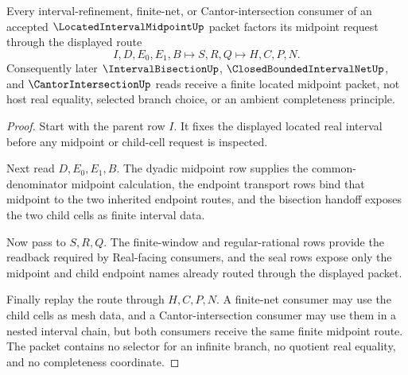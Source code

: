 \begin{theorem}
\label{thm:located-interval-midpoint-handoff}
Every interval-refinement, finite-net, or Cantor-intersection consumer of an accepted $\LocatedIntervalMidpointUp$ packet factors its midpoint request through the displayed route
$$
I,D,E_0,E_1,B \longmapsto S,R,Q \longmapsto H,C,P,N .
$$
Consequently later $\IntervalBisectionUp$, $\ClosedBoundedIntervalNetUp$, and $\CantorIntersectionUp$ reads receive a finite located midpoint packet, not host real equality, selected branch choice, or an ambient completeness principle.
\end{theorem}
\begin{proof}
Start with the parent row $I$. It fixes the displayed located real interval before any midpoint or child-cell request is inspected.

Next read $D,E_0,E_1,B$. The dyadic midpoint row supplies the common-denominator midpoint calculation, the endpoint transport rows bind that midpoint to the two inherited endpoint routes, and the bisection handoff exposes the two child cells as finite interval data.

Now pass to $S,R,Q$. The finite-window and regular-rational rows provide the readback required by Real-facing consumers, and the seal rows expose only the midpoint and child endpoint names already routed through the displayed packet.

Finally replay the route through $H,C,P,N$. A finite-net consumer may use the child cells as mesh data, and a Cantor-intersection consumer may use them in a nested interval chain, but both consumers receive the same finite midpoint route. The packet contains no selector for an infinite branch, no quotient real equality, and no completeness coordinate.
\end{proof}


